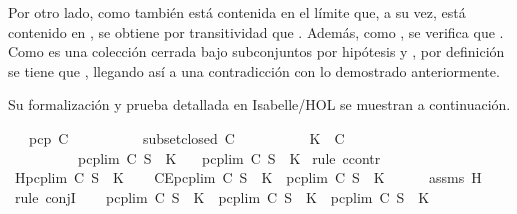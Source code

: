 \begin{isabellebody}
\begin{isamarkuptext}
\begin{demostracion}
    Por otro lado, como  también está contenida en el límite que, a su vez, está contenido en 
    , se obtiene por transitividad que . Además, como , se verifica que 
    . Como  es una colección cerrada bajo subconjuntos por hipótesis y , 
    por definición se tiene que , llegando así a una contradicción con lo demostrado 
    anteriormente.
  \end{demostracion}

  Su formalización y prueba detallada en Isabelle/HOL se muestran a continuación.%
\end{isamarkuptext}\isamarkuptrue%
\isamarkupfalse%
\isanewline
\ \ \ {\isachardoublequoteopen}pcp\ C{\isachardoublequoteclose}\isanewline
\ \ \ \ \ \ \ \ \ \ {\isachardoublequoteopen}subset{\isacharunderscore}closed\ C{\isachardoublequoteclose}\isanewline
\ \ \ \ \ \ \ \ \ \ {\isachardoublequoteopen}K\ {\isasymin}\ C{\isachardoublequoteclose}\isanewline
\ \ \ \ \ \ \ \ \ \ {\isachardoublequoteopen}pcp{\isacharunderscore}lim\ C\ S\ {\isasymsubseteq}\ K{\isachardoublequoteclose}\isanewline
\ \ \ {\isachardoublequoteopen}pcp{\isacharunderscore}lim\ C\ S\ {\isacharequal}\ K{\isachardoublequoteclose}\isanewline
%
\isadelimproof
%
\endisadelimproof
%
\isatagproof
{}\isamarkupfalse%
\ {\isacharparenleft}rule\ ccontr{\isacharparenright}\isanewline
\ \ \isamarkupfalse%
\ H{\isacharcolon}{\isachardoublequoteopen}{\isasymnot}{\isacharparenleft}pcp{\isacharunderscore}lim\ C\ S\ {\isacharequal}\ K{\isacharparenright}{\isachardoublequoteclose}\isanewline
\ \ \isamarkupfalse%
\ CE{\isacharcolon}{\isachardoublequoteopen}pcp{\isacharunderscore}lim\ C\ S\ {\isasymsubseteq}\ K\ {\isasymand}\ pcp{\isacharunderscore}lim\ C\ S\ {\isasymnoteq}\ K{\isachardoublequoteclose}\isanewline
\ \ \ \ \isamarkupfalse%
\ assms{\isacharparenleft}{}{\isacharparenright}\ H\ \isamarkupfalse%
\ {\isacharparenleft}rule\ conjI{\isacharparenright}\isanewline
\ \ \isamarkupfalse%
\ {\isachardoublequoteopen}pcp{\isacharunderscore}lim\ C\ S\ {\isasymsubseteq}\ K\ {\isasymand}\ pcp{\isacharunderscore}lim\ C\ S\ {\isasymnoteq}\ K\ {\isasymlongleftrightarrow}\ pcp{\isacharunderscore}lim\ C\ S\ {\isasymsubset}\ K{\isachardoublequoteclose}\isanewline

\end{isabellebody}
